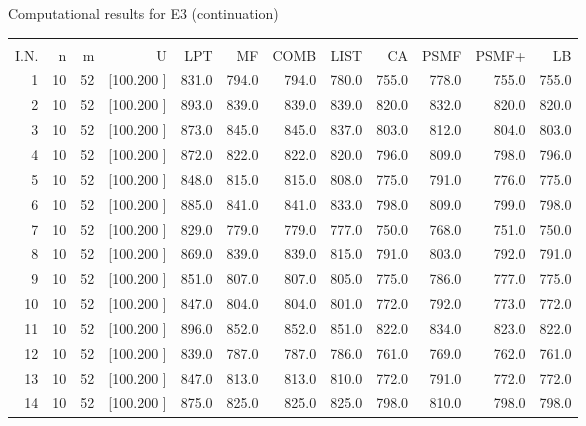 \documentclass[12pt,a4paper]{article}
\begin{document}
\newpage
\begin{center}
 Computational results for E3 (continuation) {\tiny
\begin{tabular}{r r r r r r r r r r r r}\hline
    &   &   &          &        &        &        &        &        &        &        &       \\[-0.1in]
  I.N.  &  n  &  m  &  U  &  LPT  &  MF  &  COMB  &  LIST  &  CA  & PSMF &PSMF+ & LB \\[0.03in]
\hline

   1& 10& 52&[100.200   ]&   831.0&   794.0&   794.0&   780.0&   755.0&   778.0&   755.0&   755.0\\[-0.02in]
   2& 10& 52&[100.200   ]&   893.0&   839.0&   839.0&   839.0&   820.0&   832.0&   820.0&   820.0\\[-0.02in]
   3& 10& 52&[100.200   ]&   873.0&   845.0&   845.0&   837.0&   803.0&   812.0&   804.0&   803.0\\[-0.02in]
   4& 10& 52&[100.200   ]&   872.0&   822.0&   822.0&   820.0&   796.0&   809.0&   798.0&   796.0\\[-0.02in]
   5& 10& 52&[100.200   ]&   848.0&   815.0&   815.0&   808.0&   775.0&   791.0&   776.0&   775.0\\[-0.02in]
   6& 10& 52&[100.200   ]&   885.0&   841.0&   841.0&   833.0&   798.0&   809.0&   799.0&   798.0\\[-0.02in]
   7& 10& 52&[100.200   ]&   829.0&   779.0&   779.0&   777.0&   750.0&   768.0&   751.0&   750.0\\[-0.02in]
   8& 10& 52&[100.200   ]&   869.0&   839.0&   839.0&   815.0&   791.0&   803.0&   792.0&   791.0\\[-0.02in]
   9& 10& 52&[100.200   ]&   851.0&   807.0&   807.0&   805.0&   775.0&   786.0&   777.0&   775.0\\[-0.02in]
  10& 10& 52&[100.200   ]&   847.0&   804.0&   804.0&   801.0&   772.0&   792.0&   773.0&   772.0\\[-0.02in]
  11& 10& 52&[100.200   ]&   896.0&   852.0&   852.0&   851.0&   822.0&   834.0&   823.0&   822.0\\[-0.02in]
  12& 10& 52&[100.200   ]&   839.0&   787.0&   787.0&   786.0&   761.0&   769.0&   762.0&   761.0\\[-0.02in]
  13& 10& 52&[100.200   ]&   847.0&   813.0&   813.0&   810.0&   772.0&   791.0&   772.0&   772.0\\[-0.02in]
  14& 10& 52&[100.200   ]&   875.0&   825.0&   825.0&   825.0&   798.0&   810.0&   798.0&   798.0\\[-0.02in]

\end{tabular}}
\end{center}
\end{document}
